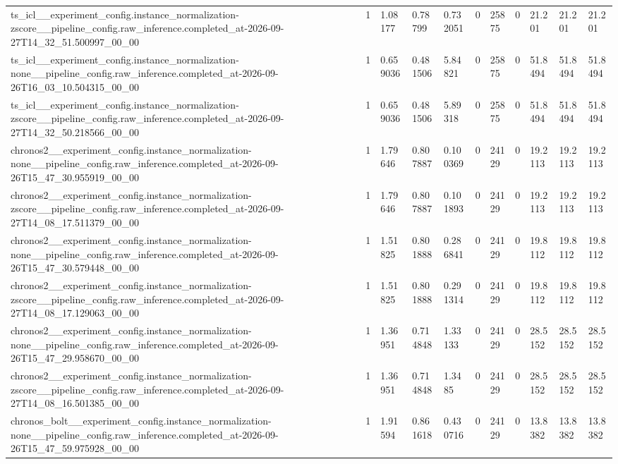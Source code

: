 \begin{tabular}{lllllllllll}
ts\_icl\_\_experiment\_config.instance\_normalization-zscore\_\_pipeline\_config.raw\_inference.completed\_at-2026-09-27T14\_32\_51.500997\_00\_00 & 1 & 1.08177 & 0.78799 & 0.732051 & 0 & 25875 & 0 & 21.201 & 21.201 & 21.201 \\
ts\_icl\_\_experiment\_config.instance\_normalization-none\_\_pipeline\_config.raw\_inference.completed\_at-2026-09-26T16\_03\_10.504315\_00\_00 & 1 & 0.659036 & 0.481506 & 5.84821 & 0 & 25875 & 0 & 51.8494 & 51.8494 & 51.8494 \\
ts\_icl\_\_experiment\_config.instance\_normalization-zscore\_\_pipeline\_config.raw\_inference.completed\_at-2026-09-27T14\_32\_50.218566\_00\_00 & 1 & 0.659036 & 0.481506 & 5.89318 & 0 & 25875 & 0 & 51.8494 & 51.8494 & 51.8494 \\
chronos2\_\_experiment\_config.instance\_normalization-none\_\_pipeline\_config.raw\_inference.completed\_at-2026-09-26T15\_47\_30.955919\_00\_00 & 1 & 1.79646 & 0.807887 & 0.100369 & 0 & 24129 & 0 & 19.2113 & 19.2113 & 19.2113 \\
chronos2\_\_experiment\_config.instance\_normalization-zscore\_\_pipeline\_config.raw\_inference.completed\_at-2026-09-27T14\_08\_17.511379\_00\_00 & 1 & 1.79646 & 0.807887 & 0.101893 & 0 & 24129 & 0 & 19.2113 & 19.2113 & 19.2113 \\
chronos2\_\_experiment\_config.instance\_normalization-none\_\_pipeline\_config.raw\_inference.completed\_at-2026-09-26T15\_47\_30.579448\_00\_00 & 1 & 1.51825 & 0.801888 & 0.286841 & 0 & 24129 & 0 & 19.8112 & 19.8112 & 19.8112 \\
chronos2\_\_experiment\_config.instance\_normalization-zscore\_\_pipeline\_config.raw\_inference.completed\_at-2026-09-27T14\_08\_17.129063\_00\_00 & 1 & 1.51825 & 0.801888 & 0.291314 & 0 & 24129 & 0 & 19.8112 & 19.8112 & 19.8112 \\
chronos2\_\_experiment\_config.instance\_normalization-none\_\_pipeline\_config.raw\_inference.completed\_at-2026-09-26T15\_47\_29.958670\_00\_00 & 1 & 1.36951 & 0.714848 & 1.33133 & 0 & 24129 & 0 & 28.5152 & 28.5152 & 28.5152 \\
chronos2\_\_experiment\_config.instance\_normalization-zscore\_\_pipeline\_config.raw\_inference.completed\_at-2026-09-27T14\_08\_16.501385\_00\_00 & 1 & 1.36951 & 0.714848 & 1.3485 & 0 & 24129 & 0 & 28.5152 & 28.5152 & 28.5152 \\
chronos\_bolt\_\_experiment\_config.instance\_normalization-none\_\_pipeline\_config.raw\_inference.completed\_at-2026-09-26T15\_47\_59.975928\_00\_00 & 1 & 1.91594 & 0.861618 & 0.430716 & 0 & 24129 & 0 & 13.8382 & 13.8382 & 13.8382 \\

\end{tabular}
